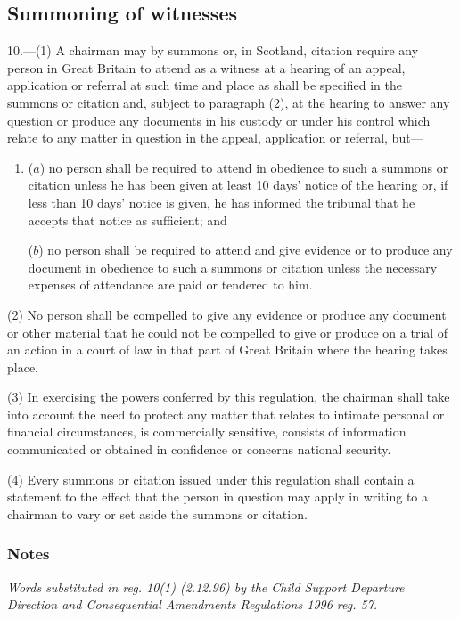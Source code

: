 \documentclass[a4paper]{article}
\newcommand\amendment[1]{\subsubsection*{Notes}{\itshape\frenchspacing\footnotesize #1 \par}}
\begin{document}
\subsection[10. Summoning of witnesses]{Summoning of witnesses}

10.—(1) A chairman may by summons or, in Scotland, citation require any person in Great Britain to attend as a witness at a hearing of an 
appeal, application or referral  %
at such time and place as shall be specified in the summons or citation and, subject to paragraph (2), at the hearing to answer any question or produce any documents in his custody or under his control which relate to any matter in question in the 
appeal, application or referral,  %
 but---
\begin{enumerate}\item[]
($a$) no person shall be required to attend in obedience to such a summons or citation unless he has been given at least 10 days' notice of the hearing or, if less than 10 days' notice is given, he has informed the tribunal that he accepts that notice as sufficient; and

($b$) no person shall be required to attend and give evidence or to produce any document in obedience to such a summons or citation unless the necessary expenses of attendance are paid or tendered to him.
\end{enumerate}

(2) No person shall be compelled to give any evidence or produce any document or other material that he could not be compelled to give or produce on a trial of an action in a court of law in that part of Great Britain where the hearing takes place.

(3) In exercising the powers conferred by this regulation, the chairman shall take into account the need to protect any matter that relates to intimate personal or financial circumstances, is commercially sensitive, consists of information communicated or obtained in confidence or concerns national security.

(4) Every summons or citation issued under this regulation shall contain a statement to the effect that the person in question may apply in writing to a chairman to vary or set aside the summons or citation.

\amendment{
Words substituted in reg. 10(1) (2.12.96) by the Child Support Departure Direction and Consequential Amendments Regulations 1996 reg. 57.
}
\end{document}
